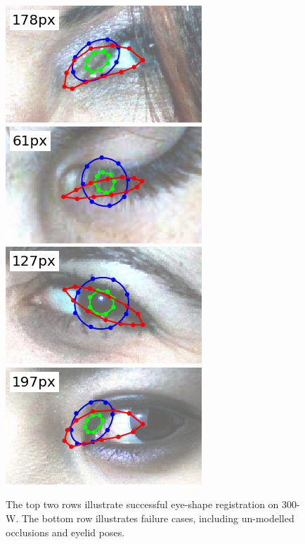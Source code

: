 \begin{figure}
    \par \vspace{0.1em}
    \includegraphics[width=0.244\columnwidth]{figs/wild_ldmks_examples/idx_934.png}\hfill
    \includegraphics[width=0.244\columnwidth]{figs/wild_ldmks_examples/idx_875.png}\hfill
    \includegraphics[width=0.244\columnwidth]{figs/wild_ldmks_examples/idx_913.png}\hfill
    \includegraphics[width=0.244\columnwidth]{figs/wild_ldmks_examples/idx_953.png}
    \caption{The top two rows illustrate successful eye-shape registration on 300-W. The bottom row illustrates failure cases, including un-modelled occlusions and eyelid poses.}
    \label{fig:example_fits_wild}
\end{figure}